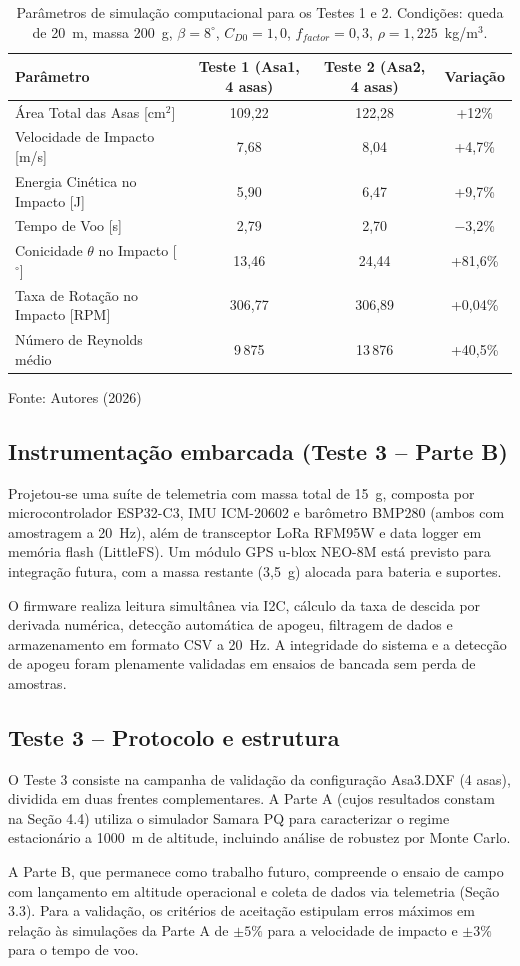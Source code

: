 \begin{table}[h]
\caption{Parâmetros de simulação computacional para os Testes 1 e 2. Condições: queda de 20~m, massa 200~g, $\beta=8^\circ$, $C_{D0}=1,0$, $f_{factor}=0,3$, $\rho=1,225$~kg/m$^3$.}
\centering
\begin{tabular*}{\textwidth}{@{\extracolsep{\fill}}lccc}
\hline
Parâmetro & Teste 1 (Asa1, 4 asas) & Teste 2 (Asa2, 4 asas) & Variação \\
\hline
Área Total das Asas [cm$^2$] & 109,22 & 122,28 & +12\% \\
Velocidade de Impacto [m/s] & 7,68 & 8,04 & +4,7\% \\
Energia Cinética no Impacto [J] & 5,90 & 6,47 & +9,7\% \\
Tempo de Voo [s] & 2,79 & 2,70 & $-$3,2\% \\
Conicidade $\theta$ no Impacto [$^\circ$] & 13,46 & 24,44 & +81,6\% \\
Taxa de Rotação no Impacto [RPM] & 306,77 & 306,89 & +0,04\% \\
Número de Reynolds médio & 9\,875 & 13\,876 & +40,5\% \\
\hline
\end{tabular*}
{\footnotesize\centering Fonte: Autores (2026)\par}
\label{tab:testes12}
\end{table}

\subsection{Instrumentação embarcada (Teste 3 -- Parte B)}

Projetou-se uma suíte de telemetria com massa total de 15~g, composta por microcontrolador ESP32-C3, IMU ICM-20602 e barômetro BMP280 (ambos com amostragem a 20~Hz), além de transceptor LoRa RFM95W e data logger em memória flash (LittleFS). Um módulo GPS u-blox NEO-8M está previsto para integração futura, com a massa restante (3,5~g) alocada para bateria e suportes.

O firmware realiza leitura simultânea via I2C, cálculo da taxa de descida por derivada numérica, detecção automática de apogeu, filtragem de dados e armazenamento em formato CSV a 20~Hz. A integridade do sistema e a detecção de apogeu foram plenamente validadas em ensaios de bancada sem perda de amostras.

\subsection{Teste 3 -- Protocolo e estrutura}

O Teste 3 consiste na campanha de validação da configuração Asa3.DXF (4 asas), dividida em duas frentes complementares. A Parte A (cujos resultados constam na Seção 4.4) utiliza o simulador Samara PQ para caracterizar o regime estacionário a 1000~m de altitude, incluindo análise de robustez por Monte Carlo. 

A Parte B, que permanece como trabalho futuro, compreende o ensaio de campo com lançamento em altitude operacional e coleta de dados via telemetria (Seção 3.3). Para a validação, os critérios de aceitação estipulam erros máximos em relação às simulações da Parte A de $\pm5\%$ para a velocidade de impacto e $\pm3\%$ para o tempo de voo.
